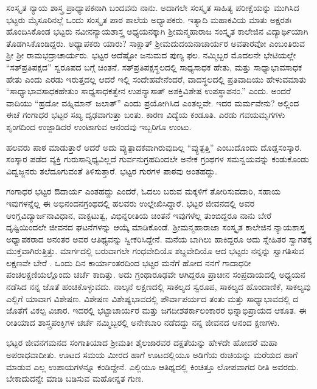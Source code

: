 ಸಂಸ್ಕೃತ ನ್ಯಾಯ ಶಾಸ್ತ್ರ ಪ್ರಾಧ್ಯಾಪಕನಾಗಿ ಬಂದವನು ನಾನು. ಅದಾಗಲೇ ಸಂಸ್ಕೃತ ಸಾಹಿತ್ಯ ಪರೀಕ್ಷೆಯನ್ನು ಮುಗಿಸಿದ ಭಟ್ಟರು ಮೈಸೂರಿನಲ್ಲೆ ಒಂದು ಸಂಸ್ಕೃತ ಪಾಠ ಶಾಲೆಯ ಅಧ್ಯಾಪಕರು.  ಇತ್ಯಾದಿ ಮಹಾಕವಿಯ ಮಾತು ಅಕ್ಷರಶಃ ಹೊಂದಿಸಿಕೊಂಡ ಭಟ್ಟರು ನವೀನನ್ಯಾಯಶಾಸ್ತ್ರ ಅಧ್ಯಯನಕ್ಕಾಗಿ ಶ್ರೀಮನ್ಮಹಾರಾಜ ಸಂಸ್ಕೃತ ಕಾಲೇಜಿನ ವಿದ್ಯಾರ್ಥಿಯಾಗಿ ತೊಡಗಿಸಿಕೊಂಡಿದ್ದರು. ಅಧ್ಯಾಪಕರು ಯಾರು? ಸಾಕ್ಷಾತ್ ಶ್ರೀಮದುದಯನಾಚಾರ್ಯರ ಅವತಾರವೋ ಎಂಬಂತಿರುವ ಶ್ರೀ ಶ್ರೀ ರಾಮಭದ್ರಾಚಾರ್ಯರು. ಭಟ್ಟರ ಅದೆಷ್ಟೋ ಜನುಮದ ಪುಣ್ಯ ಫಲ. ನಮ್ಮಿಬ್ಬರ ಮೊದಲನೇ ಭೇಟಿಯಲ್ಲೇ “ಸತ್‍ಪ್ರತಿಪಕ್ಷದ” ಸ್ವರೂಪದ ಬಗ್ಗೆ ಚಿಂತನೆ. ಸತ್‍ಪ್ರತಿಪಕ್ಷಸ್ಥಲದಲ್ಲಿ ಸಾಧ್ಯಸಾಧಕ ಹೇತು, ಮತ್ತು ಸಾಧ್ಯಾಭಾವಸಾಧಕ ಹೇತು ಎಂದು ಎರಡು ಇರುತ್ತದಲ್ಲ ಆದರೆ ಇಲ್ಲಿ ಸಂದೇಹವೇನೆಂದರೆ, ವಾದಸ್ಥಲದಲ್ಲಿ ಪ್ರತಿವಾದಿಯು ಹೇಳುವಮಾತು “ಸಾಧ್ಯಾಭಾವಸಾಧಕಹೇತುಂ ಸಾಧ್ಯಸಾಧಕತ್ವೇನ ಉಪನ್ಯಾಸಾತ್ ಅಶಕ್ತಿವಿಶೇಷ ಉಪಸ್ಥಾಪನಂ.” ಎಂದು. ಅಂದರೆ ವಾದಿಯು “ಹ್ರದೋ ವಹ್ನಿಮಾನ್ ಜಲಾತ್” ಎಂದು ಪ್ರಯೋಗಿಸಿದ ಎಂತಲ್ಲವೇ. ಇದರ ಮರ್ಮವೇನು? ಅಲ್ಲಿಂದ ಈಚೆ ಗಂಗಾಧರ ಭಟ್ಟರ ಸಖ್ಯ ದೃಢವಾಗುತ್ತಾ ಬಂತು. ಕಾರಣ ವಿದ್ಯೆಯ ಕಂಡೂತಿ. ಎರಡು ಗವಯಮೃಗಗಳು ಶೃಂಗದಿಂದ  ಉಜ್ಜಾಡಿದರೆ ಉಂಟಾಗುವ ಆನಂದವು ಇಬ್ಬರಿಗೂ ಉಂಟು.

ಹಲವರು ಪಾಠ ಮಾಡುತ್ತಾರೆ ಆದರೆ ಅದು ವ್ಯುತ್ಪಾದಕವಾಗಿರುವುದಿಲ್ಲ “ವ್ಯುತ್ಪತ್ತಿ” ಎಂಬುದೊಂದು ದೊಡ್ಡಸಂಸ್ಕಾರ. ಸಂಸ್ಕಾರ ಪಡೆದ ವ್ಯಕ್ತಿ ಗುರುಸಾನ್ನಿಧ್ಯವಿಲ್ಲದೆ ಗುರ್ವನುಗ್ರಹದಿಂದಲೇ ಅನೇಕ ಗ್ರಂಥಗಳ ಸಮನ್ವಯವನ್ನು ಕಂಡುಕೊಂಡು ವಿದ್ವಜ್ಜನರು ತಲೆದೂಗುವಂತೆ ತಿಳಿಸುತ್ತಾರೆ. ಭಟ್ಟರ ಗುರಗಳ ಪಾಠವು ಅಂತಹದ್ದು.

ಗಂಗಾಧರ ಭಟ್ಟರ  ಔದಾರ್ಯ ಎಂತಹದ್ದು ಎಂದರೆ, ಓದಲು ಬರುವ ಮಕ್ಕಳಿಗೆ ತೋರಿಸುವದಾರಿ, ಸಹಾಯ ಇವುಗಳನ್ನೆಲ್ಲ ಈ ಅಭಿನಂದನಗ್ರಂಥದಲ್ಲಿ ಹಲವರು ಉಲ್ಲೇಖಿಸಿದ್ದಾರೆ. ಭಟ್ಟರ ಜೀವನದಲ್ಲಿ ಅವರ ಆಂಗ್ಲವಿದ್ಯಾರ್ಜನಾವಿಧಾನ, ವಾಕ್ಪಟುತ್ವ, ವಿಭಿನ್ನರೀತಿಯ ಚಿಂತನೆ ಇವುಗಳೆಲ್ಲ ತುಂಬಿದ್ದರೂ ನಾನು ಬೇರೆ ದೃಷ್ಟಿಯಿಂದಲೇ ಜೀವನದ ಘಟನೆಗಳನ್ನು ಆಯ್ಕೆ ಮಾಡಿಕೊಂಡೆ. ಶ್ರೀಮನ್ಮಹಾರಾಜಾ ಸಂಸ್ಕೃತ ಕಾಲೇಜಿನ ನ್ಯಾಯಶಾಸ್ತ್ರ ಅಧ್ಯಾಪಕರಾದ ಅನಂತರ ಅವರ ಆತಿಥ್ಯವನ್ನು ಸ್ವೀಕರಿಸಿದ್ದೇನೆ. ಮನೆಯ ಬಾಗಿಲು ಹಾಕಿದ್ದರೂ ಅದು ಸ್ನೇಹಿತರ ಸ್ವಾಗತಕ್ಕೆ ಮುಕ್ತವಾಗಿರುತ್ತಿತ್ತು. ಮಾರ್ಗದಲ್ಲಿ ಬರುವಾಗಲೇ ಗಂಧವೇದಿಯೊ ಶಬ್ದವೇದಿಯೊ ಆದ ಭಟ್ಟರು ನನ್ನನ್ನು ಸ್ವಾಗತಿಸುವ ಲಕ್ಷಣವೇ ಬೇರೆ .
\newpage
ಒಂದು ದಿನ ಕಾರ್ಯಾಂತರದಿಂದ ಭಟ್ಟರ ಮನೆಗೆ ಹೋದ ನನಗೆ ಗಾದಾಧರೀ ಪಂಚಲಕ್ಷಣಿಯಲ್ಲೊಂದು ಚರ್ಚೆ ಕಾದಿತ್ತು. ಅದು ಗ್ರಂಥಾರೂಢವೇ ಆಗಿದ್ದರೂ ಪ್ರಾಚೀನ ಸಂಪ್ರದಾಯದಲ್ಲಿ ಅಧ್ಯಯನ ನಡೆಸಿದ ನನ್ನ ಜೊತೆ ಹಂಚಿಕೊಳ್ಳುವದು. ನಾಲ್ಕನೆ ಲಕ್ಷಣದಲ್ಲಿ ಸಾಕಲ್ಯದ ಸ್ವರೂಪ, ಸಾಕಲ್ಯದ ಹೊಂದಾಣಿಕೆ, ಸಾಕಲ್ಯವು ಎಲ್ಲಿಗೆ ಯಾವಾಗ ವಿಶೇಷಣ. ವಿಶೇಷಣ ವಿಶೇಷ್ಯಭಾವದಲ್ಲಿ ಪೌರ್ವಾಪರ್ಯದ ತಂತು ಮತ್ತು ಸಾಧ್ಯಾಭಾವದಲ್ಲಿ  ದ ಜೊತೆಗೆ ವಿಕಲ್ಪ ವಿಚಾರ. ಇದರಲ್ಲಿ ಭಟ್ಟಾಚಾರ್ಯರ ಮತ್ತು ಜಗದೀಶತರ್ಕಾಲಂಕಾರರ ಭಿನ್ನಾಭಿಪ್ರಾಯದ ಆಕೂತ. ಈ ರೀತಿಯಾದ ಶಾಸ್ತ್ರಪಂಕ್ತಿಗಳ ಚರ್ಚೆ ನಮ್ಮಿಬ್ಬರಲ್ಲಿ ಅನೇಕಬಾರಿ ನಡೆದದ್ದು ನನ್ನ ಜೀವನದ ಆನಂದ ಕ್ಷಣಗಳು.

ಭಟ್ಟರ ಜೀವನಗಮನದ ಸಂಗಾತಿಯಾದ ಶ್ರೀಮತೀ ಶೈಲಜಾರವರ ದಕ್ಷತೆಯನ್ನು ಹೇಳದೇ ಹೋದರೆ ಮಹಾ ಅಪರಾಧವಾದೀತು. ಊಟದ ಸಮಯ ಮೀರದ ಹಾಗೆ ಊಟದಲ್ಲಿಯೂ ಅಡಿಗೆಯ ರುಚಿಯನ್ನು ಮರೆಯದ ಹಾಗೆ ಮಾಡುವ ಎಲ್ಲ ಉಪಾಯಗಳನ್ನೂ ಕಂಡಿದ್ದೇನೆ. ಎಲ್ಲಿಯೂ ಆತಿಥ್ಯದಲ್ಲಿ ಕಿಂಚಿತ್ತೂ ಲೋಪವಾಗದ ರೀತಿ ಅವರದು. ಬೇಕಾದುದನ್ನೇ ಮಾಡಿ ಬಡಿಸುವ ಮಹೋನ್ನತ ಗುಣ.

